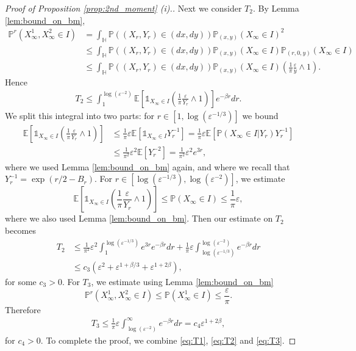 \documentclass[10pt,a4paper]{amsart}
\newcommand*{\EE}{\ensuremath{\mathbb{E}}}	        	%
\newcommand*{\HH}{\ensuremath{\mathbb{H}}}	        	%
\newcommand*{\II}{\ensuremath{\mathds{1}}}	        	%
\newcommand*{\PP}{\ensuremath{\mathbb{P}}}	        	%
\newcommand*{\eps}{\ensuremath{\varepsilon}}            %
\begin{document}
\begin{proof}[Proof of Proposition \ref{prop:2nd_moment} (i).]
Next we consider $T_2$. By Lemma \ref{lem:bound_on_bm},
\begin{align*}
    \PP^r\left(X^1_\infty,X_\infty^2\in I\right) &=\int_\HH \PP((X_r,Y_r)\in(dx,dy))\PP_{(x,y)}(X_\infty \in I)^2 \\
    &\leq \int_\HH \PP((X_r,Y_r)\in(dx,dy))\PP_{(x,y)}(X_\infty \in I)\PP_{(r,0,y)}(X_\infty \in I)\\
    &\leq \int_\HH \PP((X_r,Y_r)\in(dx,dy))\PP_{(x,y)}(X_\infty \in I)\left(\frac{1}{\pi}\frac{\eps}{y} \wedge 1\right).
\end{align*}
{Hence}
\begin{align*}
    T_2 \leq \int_1^{\log(\eps^{-2})}\EE\left[\II_{X_\infty \in I} \left(\frac{1}{\pi}\frac{\eps}{Y_r} \wedge 1\right)\right] e^{-\beta r}dr.
\end{align*}
We split this integral into two parts: for $r\in [1,\log(\eps^{-1/3})]$ we bound
\begin{align*}
    \EE\left[ \II_{X_\infty\in I}\left(\frac{1}{\pi}\frac{\eps}{Y_r} \wedge 1\right)\right] &\leq \frac{1}{\pi}\eps\EE\left[\II_{X_\infty\in I}  Y_r^{-1}\right] = \frac{1}{\pi}\eps \EE\left[\PP(X_\infty\in I \vert Y_r) 
    Y_r^{-1}\right]\\
    &\leq \frac{1}{\pi^2}\eps^2 \EE\left[
    Y_r^{-2}\right] = \frac{1}{\pi^2}\eps^2 e^{3r},
\end{align*}
where we used Lemma \ref{lem:bound_on_bm} again, and where we recall that $Y_r^{-1} = \exp(r/2-B_r)$.
{F}or $r\in  [\log(\eps^{-1/3}),\log(\eps^{-2})]$, {we estimate}
\begin{equation*}
    \EE\left[ \II_{X_\infty\in I}\left(\frac{1}{\pi}\frac{\eps}{Y_r} \wedge 1\right)\right] \leq \PP(X_\infty \in I) \leq \frac{1}{\pi}\eps,
\end{equation*}
where we also used Lemma \ref{lem:bound_on_bm}.
Then our estimate on $T_2$ becomes
\begin{align}
    T_2 &\leq \frac{1}{\pi^2}\eps^2\int_1^{\log(\eps^{-1/3})} e^{3r}e^{-\beta r}dr + \frac{1}{\pi}\eps\int_{\log(\eps^{-1/3})}^{\log(\eps^{-2})}e^{-\beta r}dr \nonumber\\
    &\leq c_3\left(\eps^2 + \eps^{1+\beta/3} + \eps^{1+2\beta}\right), \label{eq:T2}
\end{align}
for some $c_3>0$.
For $T_3$, we estimate using Lemma \ref{lem:bound_on_bm}
\begin{equation*}
    \PP^r(X_\infty^1, X_\infty^2 \in I)\leq \PP(X_\infty^1\in I) \leq \frac{\eps}{\pi}.
\end{equation*}
Therefore
\begin{align}\label{eq:T3}
    T_3\leq \frac{1}{\pi}\eps \int_{\log(\eps^{-2})}^\infty e^{-\beta r}dr = c_4 \eps^{1+2\beta},
\end{align}
for $c_4>0$. 
To complete the proof, we combine \eqref{eq:T1}, \eqref{eq:T2} and \eqref{eq:T3}.


\end{proof}
\end{document}
